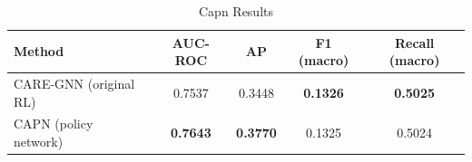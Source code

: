 \begin{table}[ht]
\centering
\caption{Capn Results}
\label{tab:capn}
\begin{tabular}{lcccc}
\toprule
Method & AUC-ROC & AP & F1 (macro) & Recall (macro) \\
\midrule
CARE-GNN (original RL) & 0.7537 & 0.3448 & \textbf{0.1326} & \textbf{0.5025} \\
CAPN (policy network) & \textbf{0.7643} & \textbf{0.3770} & 0.1325 & 0.5024 \\
\bottomrule
\end{tabular}
\end{table}